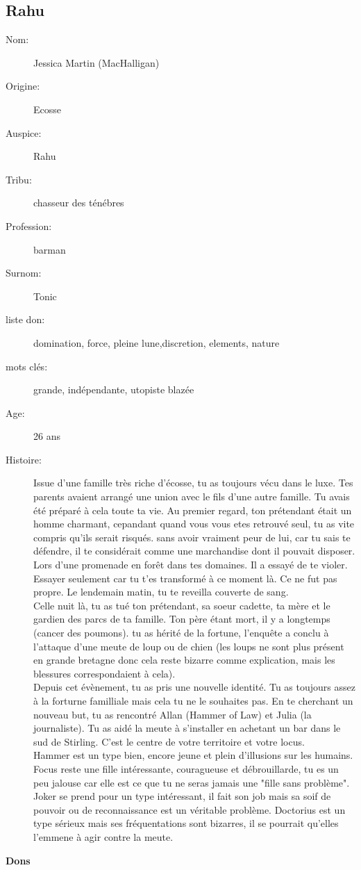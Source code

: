 \documentclass[oneside,12pt]{book}
\begin{document}
\begin{flushleft}
\section{Rahu}
\begin{description}
\item[Nom:]{Jessica Martin (MacHalligan)}
\item[Origine:]{Ecosse}
\item[Auspice:]{Rahu}
\item[Tribu:]{chasseur des ténébres}
\item[Profession:]{barman}
\item[Surnom:]{Tonic}
\item[liste don:]{domination, force, pleine lune,discretion, elements, nature}
\item[mots clés:]{grande, indépendante, utopiste blazée}
\item[Age:]{26 ans}
\item[Histoire:]{ 
Issue d'une famille très riche d'écosse, tu as toujours vécu dans le luxe. Tes parents avaient arrangé une union avec le fils d'une autre famille. Tu avais été préparé à cela toute ta vie. Au premier regard, ton prétendant était un homme charmant, cepandant quand vous vous etes retrouvé seul, tu as vite compris qu'ils serait risqués. sans avoir vraiment peur de lui, car tu sais te défendre, il te considérait comme une marchandise dont il pouvait disposer. Lors d'une promenade en forêt dans tes domaines. Il a essayé de te violer. Essayer seulement car tu t'es transformé à ce moment là. Ce ne fut pas propre. Le lendemain matin, tu te reveilla couverte de sang. \\ 
Celle nuit là, tu as tué ton prétendant, sa soeur cadette, ta mère et le gardien des parcs de ta famille. Ton père étant mort, il y a longtemps (cancer des poumons).    tu as hérité de la fortune, l'enquête a conclu à l'attaque d'une meute de loup ou de chien (les loups ne sont plus présent en grande bretagne donc cela reste bizarre comme explication, mais les blessures correspondaient à cela).\\
Depuis cet évènement, tu as pris une nouvelle identité. Tu as toujours assez à la forturne familliale mais cela tu ne le souhaites pas. En te cherchant un nouveau but, tu as rencontré Allan (Hammer of Law) et Julia (la journaliste). Tu as aidé la meute à s'installer en achetant un bar dans le sud de Stirling. C'est le centre de votre territoire et votre locus.\\

Hammer est un type bien, encore jeune et plein d'illusions sur les humains. 
Focus reste une fille intéressante, couragueuse et débrouillarde, tu es un peu jalouse car elle est ce que tu ne seras jamais une "fille sans problème". 
Joker se prend pour un type intéressant, il fait son job mais sa soif de pouvoir ou de reconnaissance est un véritable problème.
Doctorius est un type sérieux mais ses fréquentations sont bizarres, il se pourrait qu'elles l'emmene à agir contre la meute.
}
\end{description}
\clearpage
\textbf{\large Dons} 
\vspace{0.5cm}



\end{flushleft}
\end{document}
